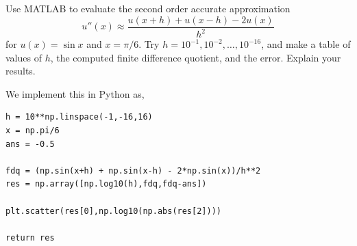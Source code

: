 \documentclass[10pt]{article}
\begin{document}
\maketitle

\begin{problem}[Exercise 1]
Use MATLAB to evaluate the second order accurate approximation 
\[ u'' (x) \approx \frac{u(x+h) + u(x-h) - 2 u(x)}{h^2} \] 
    for \(u(x) = \sin x\) and \(x = \pi / 6\).  Try \(h = 10^{-1} , 10^{-2} , \ldots , 10^{-16}\), and make a table of values of \(h\), the computed finite difference quotient, and the error.  Explain your results.
\end{problem}

\begin{solution}[Solution]
We implement this in Python as,
\begin{lstlisting}
h = 10**np.linspace(-1,-16,16)
x = np.pi/6
ans = -0.5

fdq = (np.sin(x+h) + np.sin(x-h) - 2*np.sin(x))/h**2
res = np.array([np.log10(h),fdq,fdq-ans])

plt.scatter(res[0],np.log10(np.abs(res[2])))

return res
\end{lstlisting}


\end{solution}
\end{document}
